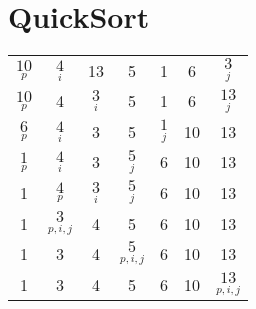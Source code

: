 \documentclass[sectionformat = exercise]{gadsescript}
\begin{document}
\section{QuickSort}
\begin{tabular}{ccccccc}
	\hline
	$\underset{p}{10}$ & $\underset{i}{4}$ & 13 & 5 & 1 & 6 & $\underset{j}{3}$ \\
	$\underset{p}{10}$ & 4 & $\underset{i}{3}$ & 5 & 1 & 6 & $\underset{j}{13}$ \\
	$\underset{p}{6}$ & $\underset{i}{4}$ & 3 & 5 & $\underset{j}{1}$ & {\color{violet}10} & 13 \\
	$\underset{p}{1}$ & $\underset{i}{4}$ & 3 & $\underset{j}{5}$ & {\color{violet}6} & {\color{violet}10} & 13 \\
	{\color{violet}1} & $\underset{p}{4}$ & $\underset{i}{3}$ & $\underset{j}{5}$ & {\color{violet}6} & {\color{violet}10} & 13 \\
	{\color{violet}1} & $\underset{p,i,j}{3}$ & {\color{violet}4} & 5 & {\color{violet}6} & {\color{violet}10} & 13 \\
	{\color{violet}1} & {\color{violet}3} & {\color{violet}4} & $\underset{p,i,j}{5} $ & {\color{violet}6} & {\color{violet}10} & 13 \\
	{\color{violet}1} & {\color{violet}3} & {\color{violet}4} & {\color{violet}5} & {\color{violet}6} & {\color{violet}10} & $\underset{p,i,j}{13}$ \\
	\hline
\end{tabular}
\end{document}
